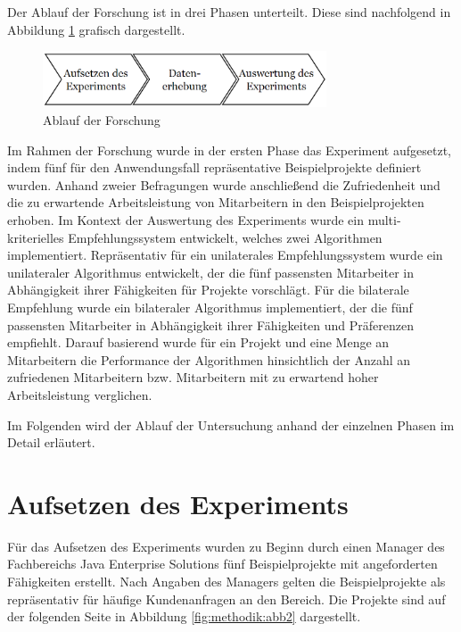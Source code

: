 Der Ablauf der Forschung ist in drei Phasen unterteilt.
Diese sind nachfolgend in Abbildung \ref{fig:methodik:abb1} grafisch dargestellt.

\begin{figure}[H]
    \centering
	\includegraphics[width=0.75\textwidth]{gfx/prozess-forschung.png}
	\caption[Ablauf der Forschung]{Ablauf der Forschung}
	\label{fig:methodik:abb1}
\end{figure}

Im Rahmen der Forschung wurde in der ersten Phase das Experiment aufgesetzt, indem fünf für den Anwendungsfall repräsentative Beispielprojekte definiert wurden.
Anhand zweier Befragungen wurde anschließend die Zufriedenheit und die zu erwartende Arbeitsleistung von Mitarbeitern in den Beispielprojekten erhoben.
Im Kontext der Auswertung des Experiments wurde ein multi-kriterielles Empfehlungssystem entwickelt, welches zwei Algorithmen implementiert.
Repräsentativ für ein unilaterales Empfehlungssystem wurde ein unilateraler Algorithmus entwickelt, der die fünf passensten Mitarbeiter in Abhängigkeit ihrer Fähigkeiten für Projekte vorschlägt.
Für die bilaterale Empfehlung wurde ein bilateraler Algorithmus implementiert, der die fünf passensten Mitarbeiter in Abhängigkeit ihrer Fähigkeiten und Präferenzen empfiehlt.
Darauf basierend wurde für ein Projekt und eine Menge an Mitarbeitern die Performance der Algorithmen hinsichtlich der Anzahl an zufriedenen Mitarbeitern bzw. Mitarbeitern mit zu erwartend hoher Arbeitsleistung verglichen.

Im Folgenden wird der Ablauf der Untersuchung anhand der einzelnen Phasen im Detail erläutert.

\section{Aufsetzen des Experiments}
Für das Aufsetzen des Experiments wurden zu Beginn durch einen Manager des Fachbereichs Java Enterprise Solutions fünf Beispielprojekte mit angeforderten Fähigkeiten erstellt.
Nach Angaben des Managers gelten die Beispielprojekte als repräsentativ für häufige Kundenanfragen an den Bereich.
Die Projekte sind auf der folgenden Seite in Abbildung \ref{fig:methodik:abb2} dargestellt.

